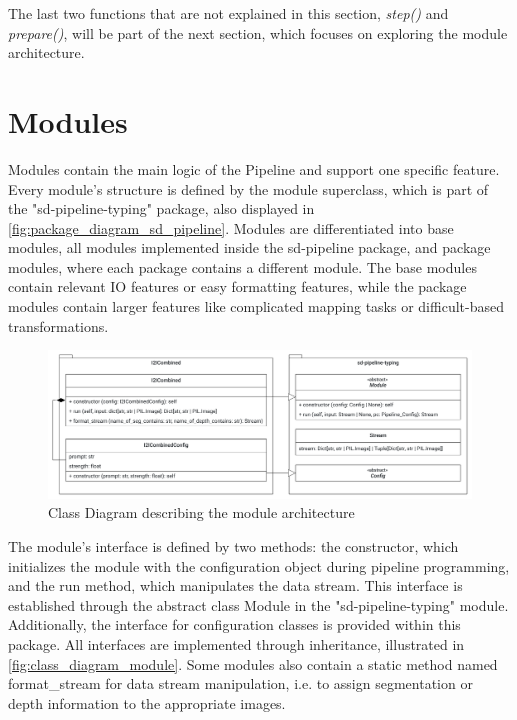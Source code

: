 The last two functions that are not explained in this section, \textit{step()} and \textit{prepare()}, will be part of the next section, which focuses on exploring the module architecture.

\section{Modules}
\label{sec:modules}

Modules contain the main logic of the Pipeline and support one specific feature. Every module's structure is defined by the module superclass, which is part of the "sd-pipeline-typing" package, also displayed in \autoref{fig:package_diagram_sd_pipeline}. Modules are differentiated into base modules, all modules implemented inside the sd-pipeline package, and package modules, where each package contains a different module. The base modules contain relevant IO features or easy formatting features, while the package modules contain larger features like complicated mapping tasks or difficult-based transformations.
\begin{figure}[H]
  \centering
  \includegraphics[width=\textwidth]{figures/own_work/pipeline/class_diagram_modules.pdf}
  \caption{Class Diagram describing the module architecture}
  \label{fig:class_diagram_module}
  \clearpage
\end{figure}

The module's interface is defined by two methods: the constructor, which initializes the module with the configuration object during pipeline programming, and the run method, which manipulates the data stream. This interface is established through the abstract class Module in the "sd-pipeline-typing" module. Additionally, the interface for configuration classes is provided within this package. All interfaces are implemented through inheritance, illustrated in \autoref{fig:class_diagram_module}.
Some modules also contain a static method named format\_stream for data stream manipulation, i.e. to assign segmentation or depth information to the appropriate images.


